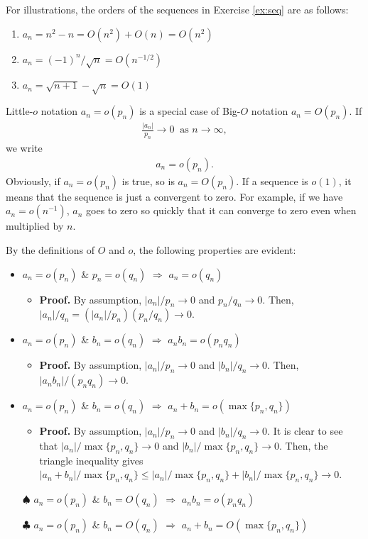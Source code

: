 \documentclass[11pt, A4paper, openany, uplatex]{book}
\begin{document}
For illustrations, the orders of the sequences in Exercise \ref{ex:seq} are as follows:
\begin{enumerate}
	\item $a_n = n^2 - n = O(n^2) + O(n) = O(n^2)$
	\item $a_n = (-1)^n/\sqrt{n} = O(n^{-1/2})$
	\item $a_n = \sqrt{n + 1} - \sqrt{n} = O(1)$
\end{enumerate}


Little-$o$ notation $a_n = o(p_n)$ is a special case of Big-$O$ notation $a_n = O(p_n)$.
If
\begin{align*}
	\frac{|a_n|}{p_n} \to 0 \;\; \text{as $n \to \infty$},
\end{align*}
we write
\begin{align*}
	a_n = o(p_n).
\end{align*}
Obviously, if $a_n = o(p_n)$ is true, so is $a_n = O(p_n)$.
If a sequence is $o(1)$, it means that the sequence is just a convergent to zero.
For example, if we have $a_n = o(n^{-1})$, $a_n$ goes to zero so quickly that it can converge to zero even when multiplied by $n$.

By the definitions of $O$ and $o$, the following properties are evident:
\begin{lemma}\label{lem:smallo}
\begin{itemize}
	\item $a_n = o(p_n)$ \& $p_n = o(q_n)$ $\Longrightarrow$ $a_n = o(q_n)$
	\begin{itemize}
		\item \upshape \textbf{Proof.} By assumption, $|a_n|/p_n \to 0$ and $p_n/q_n \to 0$. Then, $|a_n|/q_n = (|a_n|/p_n)(p_n/q_n) \to 0$.
	\end{itemize}
	\item $a_n = o(p_n)$ \& $b_n = o(q_n)$ $\Longrightarrow$ $a_n b_n = o(p_n q_n)$
	\begin{itemize}
		\item \upshape \textbf{Proof.} By assumption, $|a_n|/p_n \to 0$ and $|b_n|/q_n \to 0$.
		Then, $|a_n b_n|/(p_n q_n) \to 0$.
	\end{itemize}
	\item $a_n = o(p_n)$ \& $b_n = o(q_n)$ $\Longrightarrow$ $a_n + b_n = o(\max\{p_n, q_n\})$
	\begin{itemize}
		\item \upshape \textbf{Proof.} By assumption, $|a_n|/p_n \to 0$ and $|b_n|/q_n \to 0$.
		It is clear to see that $|a_n|/\max\{p_n, q_n\} \to 0$ and $|b_n|/\max\{p_n, q_n\} \to 0$.
		Then, the triangle inequality gives $|a_n + b_n|/\max\{p_n, q_n\} \le |a_n|/\max\{p_n, q_n\} + |b_n|/\max\{p_n, q_n\} \to 0$.
	\end{itemize}
	\item[$\spadesuit$] $a_n = o(p_n)$ \& $b_n = O(q_n)$ $\Longrightarrow$ $a_n b_n = o(p_n q_n)$
	\item[$\clubsuit$] $a_n = o(p_n)$ \& $b_n = O(q_n)$ $\Longrightarrow$ $a_n + b_n = O(\max\{p_n, q_n\})$
\end{itemize}
\end{lemma}
\end{document}
